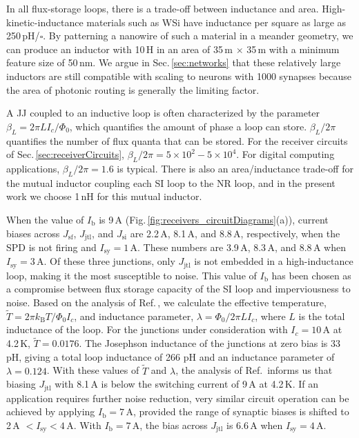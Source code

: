 \documentclass[aip,amsmath,amssymb,reprint,nofootinbib]{revtex4-1}
\begin{document}
In all flux-storage loops, there is a trade-off between inductance and area. High-kinetic-inductance materials such as WSi have inductance per square as large as 250\,pH/$\square$. By patterning a nanowire of such a material in a meander geometry, we can produce an inductor with 10\,\textmu H in an area of 35\,\textmu m $\times$ 35\,\textmu m with a minimum feature size of 50\,nm. We argue in Sec.\,\ref{sec:networks} that these relatively large inductors are still compatible with scaling to neurons with 1000 synapses because the area of photonic routing is generally the limiting factor.

A JJ coupled to an inductive loop is often characterized by the parameter $\beta_L = 2\pi L I_c/\Phi_0$, which quantifies the amount of phase a loop can store. $\beta_L / 2\pi$ quantifies the number of flux quanta that can be stored. For the receiver circuits of Sec.\,\ref{sec:receiverCircuits}, $\beta_L/2\pi = 5\times10^2 - 5\times10^4$. For digital computing applications, $\beta_L/2\pi = 1.6$ is typical. There is also an area/inductance trade-off for the mutual inductor coupling each SI loop to the NR loop, and in the present work we choose 1\,nH for this mutual inductor.

When the value of $I_{\mathrm{b}}$ is 9\,\textmu A (Fig.\,\ref{fig:receivers_circuitDiagrams}(a)), current biases across $J_{\mathrm{sf}}$, $J_{\mathrm{jtl}}$, and $J_{\mathrm{si}}$ are 2.2\,\textmu A, 8.1\,\textmu A, and 8.8\,\textmu A, respectively, when the SPD is not firing and $I_{\mathrm{sy}} = 1$\,\textmu A. These numbers are 3.9\,\textmu A, 8.3\,\textmu A, and 8.8\,\textmu A when $I_{\mathrm{sy}} = 3$\,\textmu A. Of these three junctions, only $J_{\mathrm{jtl}}$ is not embedded in a high-inductance loop, making it the most susceptible to noise. This value of $I_{\mathrm{b}}$ has been chosen as a compromise between flux storage capacity of the SI loop and imperviousness to noise. Based on the analysis of Ref.\,, we calculate the effective temperature, $\tilde{T} = 2\pi k_{\mathrm{B}} T/\Phi_0 I_c$, and inductance parameter, $\lambda = \Phi_0/2\pi LI_c$, where $L$ is the total inductance of the loop. For the junctions under consideration with $I_c = 10$\,\textmu A at 4.2\,K, $\tilde{T} = 0.0176$. The Josephson inductance of the junctions at zero bias is 33\,pH, giving a total loop inductance of 266 pH and an inductance parameter of $\lambda = 0.124$. With these values of $\tilde{T}$ and $\lambda$, the analysis of Ref.\, informs us that biasing $J_{\mathrm{jtl}}$ with 8.1\,\textmu A is below the switching current of 9\,\textmu A at 4.2\,K. If an application requires further noise reduction, very similar circuit operation can be achieved by applying $I_{\mathrm{b}} = 7$\,\textmu A, provided the range of synaptic biases is shifted to 2\,\textmu A $< I_{\mathrm{sy}} < 4$\,\textmu A. With $I_{\mathrm{b}} = 7$\,\textmu A, the bias across $J_{\mathrm{jtl}}$ is 6.6\,\textmu A when $I_{\mathrm{sy}} = 4$\,\textmu A.
\end{document}
